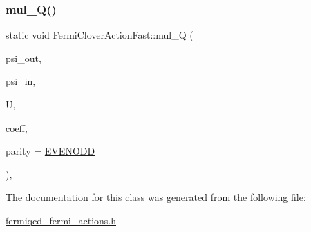 \subsubsection{\texorpdfstring{mul\+\_\+\+Q()}{mul\_Q()}}
{\footnotesize\ttfamily static void Fermi\+Clover\+Action\+Fast\+::mul\+\_\+Q (\begin{DoxyParamCaption}\item[{\hyperlink{classfermi__field}{fermi\+\_\+field} \&}]{psi\+\_\+out,  }\item[{\hyperlink{classfermi__field}{fermi\+\_\+field} \&}]{psi\+\_\+in,  }\item[{\hyperlink{classgauge__field}{gauge\+\_\+field} \&}]{U,  }\item[{\hyperlink{classcoefficients}{coefficients} \&}]{coeff,  }\item[{int}]{parity = {\ttfamily \hyperlink{mdp__global__vars_8h_a4c9de81f2de5a74b588107b6c0afb9ee}{E\+V\+E\+N\+O\+DD}} }\end{DoxyParamCaption})\hspace{0.3cm}{\ttfamily [inline]}, {\ttfamily [static]}}



The documentation for this class was generated from the following file\+:\begin{DoxyCompactItemize}
\item 
\hyperlink{fermiqcd__fermi__actions_8h}{fermiqcd\+\_\+fermi\+\_\+actions.\+h}\end{DoxyCompactItemize}
